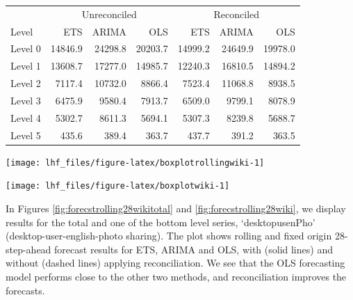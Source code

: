 \documentclass[11pt,a4paper,]{article}
\let\origfigure\figure
\let\endorigfigure\endfigure
\renewenvironment{figure}[1][2] {
    \expandafter\origfigure\expandafter[!htbp]
} {
    \endorigfigure
}
\let\origtable\table
\let\endorigtable\endtable
\renewenvironment{table}[1][2] {
    \expandafter\origtable\expandafter[!htbp]
} {
    \endorigtable
}
\begin{document}
\begin{table}[t]

\caption{\label{tab:wikipediadataresultRMSE}Mean(RMSE) for ETS, ARIMA and OLS with and without reconciliation - Fixed origin 28-step-ahead - Wikipedia dataset}
\centering
\begin{tabular}{lrrrrrr}
\toprule
\multicolumn{1}{c}{} & \multicolumn{3}{c}{Unreconciled} & \multicolumn{3}{c}{Reconciled} \\
\cmidrule(l{2pt}r{2pt}){2-4} \cmidrule(l{2pt}r{2pt}){5-7}
Level & ETS & ARIMA & OLS & ETS & ARIMA & OLS\\
\midrule
Level 0 & 14846.9 & 24298.8 & 20203.7 & 14999.2 & 24649.9 & 19978.0\\
Level 1 & 13608.7 & 17277.0 & 14985.7 & 12240.3 & 16810.5 & 14894.2\\
Level 2 & 7117.4 & 10732.0 & 8866.4 & 7523.4 & 11068.8 & 8938.5\\
Level 3 & 6475.9 & 9580.4 & 7913.7 & 6509.0 & 9799.1 & 8078.9\\
Level 4 & 5302.7 & 8611.3 & 5694.1 & 5307.3 & 8239.8 & 5688.7\\
Level 5 & 435.6 & 389.4 & 363.7 & 437.7 & 391.2 & 363.5\\
\bottomrule
\end{tabular}
\end{table}

\begin{figure}

{\centering \texttt{[image: lhf\_files/figure-latex/boxplotrollingwiki-1]} 

}

\caption{Box plots of forecast errors for reconciled and unreconciled ETS, ARIMA and OLS methods at each hierarchical level for rolling origin 28-step-ahead Wikipedia pageviews.}\label{fig:boxplotrollingwiki}
\end{figure}

\begin{figure}

{\centering \texttt{[image: lhf\_files/figure-latex/boxplotwiki-1]} 

}

\caption{Box plots of forecast errors for reconciled and unreconciled ETS, ARIMA and OLS methods at each hierarchical level for fixed origin 28-step-ahead Wikipedia pageviews.}\label{fig:boxplotwiki}
\end{figure}

In Figures \ref{fig:forecstrolling28wikitotal} and
\ref{fig:forecstrolling28wiki}, we display results for the total and one
of the bottom level series, `desktopusenPho' (desktop-user-english-photo
sharing). The plot shows rolling and fixed origin 28-step-ahead forecast
results for ETS, ARIMA and OLS, with (solid lines) and without (dashed
lines) applying reconciliation. We see that the OLS forecasting model
performs close to the other two methods, and reconciliation improves the
forecasts.
\end{document}
